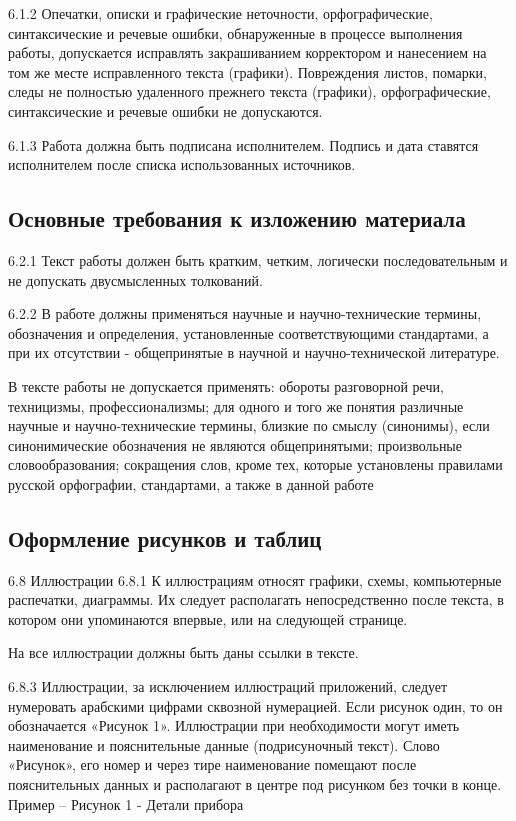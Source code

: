 \documentclass[bachelor, och, coursework]{SCWorks}
\begin{document}
6.1.2 Опечатки, описки и графические неточности, орфографические, синтаксические и речевые ошибки, обнаруженные в процессе выполнения работы,
допускается исправлять закрашиванием корректором и нанесением на том же
месте исправленного текста (графики).
Повреждения листов, помарки, следы не полностью удаленного прежнего
текста (графики), орфографические, синтаксические и речевые ошибки не допускаются.

6.1.3 Работа должна быть подписана исполнителем. Подпись и дата ставятся исполнителем после списка использованных источников.

\subsection{Основные требования к изложению материала}

6.2.1 Текст работы должен быть кратким, четким, логически последовательным и не допускать двусмысленных толкований.

6.2.2 В работе должны применяться научные и научно-технические термины,
обозначения и определения, установленные соответствующими стандартами, а
при их отсутствии - общепринятые в научной и научно-технической литературе.

В тексте работы не допускается применять:
обороты разговорной речи, техницизмы, профессионализмы;
для одного и того же понятия различные научные и научно-технические
термины, близкие по смыслу (синонимы), если синонимические обозначения не
являются общепринятыми;
произвольные словообразования;
сокращения слов, кроме тех, которые установлены правилами русской
орфографии, стандартами, а также в данной работе

\subsection{Оформление рисунков и таблиц}

6.8 Иллюстрации
6.8.1 К иллюстрациям относят графики, схемы, компьютерные распечатки, диаграммы. Их следует располагать непосредственно после
текста, в котором они упоминаются впервые, или на следующей странице.

На все иллюстрации должны быть даны ссылки в тексте.

6.8.3 Иллюстрации, за исключением иллюстраций приложений, следует нумеровать арабскими цифрами сквозной нумерацией.
Если рисунок один, то он обозначается «Рисунок 1».
Иллюстрации при необходимости могут иметь наименование и пояснительные данные (подрисуночный текст). Слово «Рисунок», его номер и через тире
наименование помещают после пояснительных данных и располагают в центре
под рисунком без точки в конце.
Пример – Рисунок 1 - Детали прибора
\end{document}
